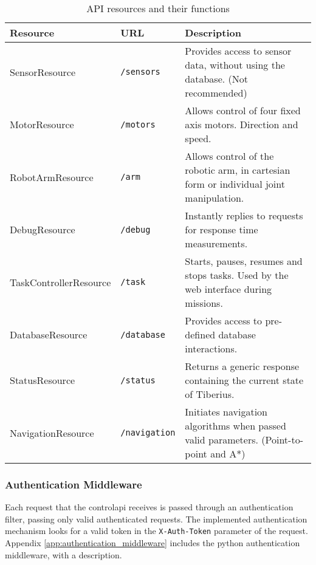 \begin{table}[!htb]
\centering
\begin{tabular}{|l|l|p{6cm}|}
\hline
\textbf{Resource}      & \textbf{URL} & \textbf{Description}                                                                   \\ \hline
SensorResource         & \texttt{/sensors}     & Provides access to sensor data, without using the database. (Not recommended)          \\ \hline
MotorResource          & \texttt{/motors}      & Allows control of four fixed axis motors. Direction and speed.                         \\ \hline
RobotArmResource       & \texttt{/arm}         & Allows control of the robotic arm, in cartesian form or individual joint manipulation. \\ \hline
DebugResource          & \texttt{/debug}       & Instantly replies to requests for response time measurements.                          \\ \hline
TaskControllerResource & \texttt{/task}        & Starts, pauses, resumes and stops tasks. Used by the web interface during missions.    \\ \hline
DatabaseResource       & \texttt{/database}    & Provides access to pre-defined database interactions.                                  \\ \hline
StatusResource         & \texttt{/status}      & Returns a generic response containing the current state of Tiberius.                   \\ \hline
NavigationResource     & \texttt{/navigation}  & Initiates navigation algorithms when passed valid parameters. (Point-to-point and A*)  \\ \hline
\end{tabular}
\caption{API resources and their functions}
\label{tab:web_api_resources}
\end{table}

\subsubsection{Authentication Middleware}
Each request that the \gls{controlapi} receives is passed through an authentication filter, passing only valid authenticated requests. The implemented authentication mechanism looks for a valid token in the \texttt{X-Auth-Token} parameter of the request. Appendix \ref{app:authentication_middleware} includes the \gls{python} authentication middleware, with a description.

